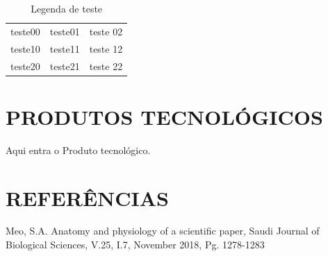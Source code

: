 \documentclass[
12pt,		%
openright,	%
twoside,  %
a4paper,			%
chapter=TITLE,		%
english,			%
french,				%
spanish,			%
brazil				%
]{USPSC-classe/USPSC}
\begin{document}
\begin{table}[htb]
\tiny
\caption{\label{e1fee5245f1f580d36a53669e2e1e0d16ec34593}Legenda de teste}

\centering
\begin{tabular}{|c|c|c|}
\hline
teste00  &  teste01  &  teste 02 \\
teste10  &  teste11  &  teste 12 \\
teste20  &  teste21  &  teste 22 \\
\hline
\end{tabular}
\end{table}


\chapter[PRODUTOS TECNOL\'OGICOS]{PRODUTOS TECNOL\'OGICOS}\label{PRODUTOS TECNOL\'OGICOS}
Aqui entra o Produto tecnol\'ogico.










\chapter[REFER\^ENCIAS]{REFER\^ENCIAS}\label{REFER\^ENCIAS}
\begin{flushleft}
\begin{flushleft}
\begin{flushleft}
\begin{flushleft}
\begin{flushleft}
\begin{flushleft}
\begin{flushleft}
\begin{flushleft}
\begin{flushleft}
\begin{flushleft}
[MEO, 2018] Meo, S.A. Anatomy and physiology of a scientific paper, Saudi Journal of Biological Sciences, V.25, I.7, November 2018, Pg. 1278-1283
\end{flushleft}


\end{flushleft}


\end{flushleft}


\end{flushleft}


\end{flushleft}


\end{flushleft}


\end{flushleft}


\end{flushleft}


\end{flushleft}


\end{flushleft}
\end{document}
